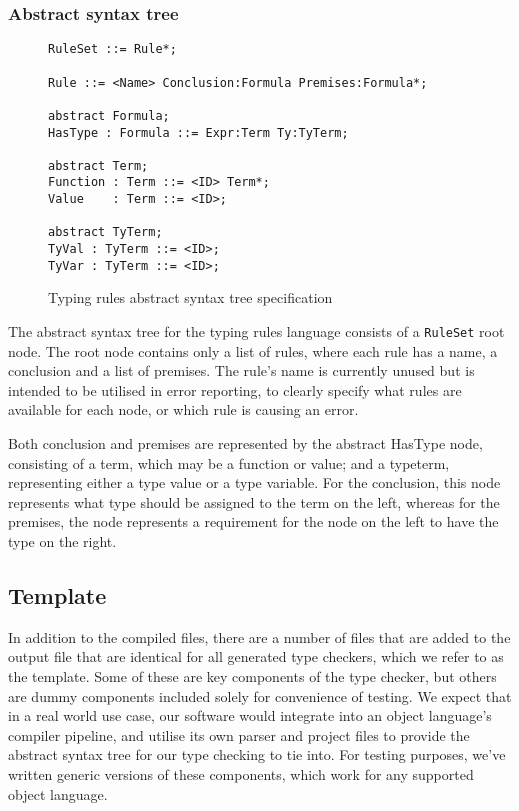 \documentclass[nofilelist]{cslthse-msc}
\begin{document}
\subsubsection{Abstract syntax tree}\label{typingrulesast}
\begin{figure}[h]
\begin{lstlisting}[]
RuleSet ::= Rule*;

Rule ::= <Name> Conclusion:Formula Premises:Formula*;

abstract Formula;
HasType : Formula ::= Expr:Term Ty:TyTerm;

abstract Term;
Function : Term ::= <ID> Term*;
Value    : Term ::= <ID>;

abstract TyTerm;
TyVal : TyTerm ::= <ID>;
TyVar : TyTerm ::= <ID>;
\end{lstlisting}
  \caption{Typing rules abstract syntax tree specification}
  \label{trastspec}
\end{figure}

The abstract syntax tree for the typing rules language consists of a \lstinline{RuleSet} root node.
The root node contains only a list of rules, where each rule has a name, a conclusion and a list of premises.
The rule's name is currently unused but is intended to be utilised in error reporting, to clearly specify what rules are available for each node, or which rule is causing an error.

Both conclusion and premises are represented by the abstract HasType node, consisting of a term, which may be a function or value; and a typeterm, representing either a type value or a type variable.
For the conclusion, this node represents what type should be assigned to the term on the left, whereas for the premises, the node represents a requirement for the node on the left to have the type on the right.

\subsection{Template}
In addition to the compiled files, there are a number of files that are added to the output file that are identical for all generated type checkers, which we refer to as the template.
Some of these are key components of the type checker, but others are dummy components included solely for convenience of testing.
We expect that in a real world use case, our software would integrate into an object language's compiler pipeline, and utilise its own parser and project files to provide the abstract syntax tree for our type checking to tie into.
For testing purposes, we've written generic versions of these components, which work for any supported object language.
\end{document}
